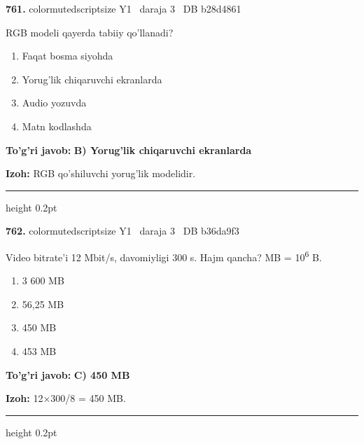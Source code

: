 \documentclass[10pt,a4paper,oneside]{article}
\begin{document}
\noindent\textbf{\color{ink}761.}  {color{muted}scriptsize Y1 \textbullet\ daraja 3 \textbullet\ DB b28d4861}
\par
RGB modeli qayerda tabiiy qo'llanadi?
\begin{enumerate}[label=\Alph*),leftmargin=9mm]
\item Faqat bosma siyohda
\item Yorug'lik chiqaruvchi ekranlarda
\item Audio yozuvda
\item Matn kodlashda
\end{enumerate}
\begin{tcolorbox}[enhanced,breakable,colback=teal!4,colframe=teal!50!black,boxrule=0.5pt,arc=1.1mm,left=3mm,right=3mm,top=1.7mm,bottom=1.7mm,before skip=2mm,after skip=2mm]
\textbf{\color{teal}To'g'ri javob:} \textbf{B) Yorug'lik chiqaruvchi ekranlarda}
\par\smallskip
\textbf{Izoh:} RGB qo'shiluvchi yorug'lik modelidir.
\end{tcolorbox}
\vspace{2mm}\hrule height 0.2pt \vspace{3mm}

\noindent\textbf{\color{ink}762.}  {color{muted}scriptsize Y1 \textbullet\ daraja 3 \textbullet\ DB b36da9f3}
\par
Video bitrate'i 12 Mbit/s, davomiyligi 300 s. Hajm qancha? MB = 10\textsuperscript{6} B.
\begin{enumerate}[label=\Alph*),leftmargin=9mm]
\item 3 600 MB
\item 56,25 MB
\item 450 MB
\item 453 MB
\end{enumerate}
\begin{tcolorbox}[enhanced,breakable,colback=teal!4,colframe=teal!50!black,boxrule=0.5pt,arc=1.1mm,left=3mm,right=3mm,top=1.7mm,bottom=1.7mm,before skip=2mm,after skip=2mm]
\textbf{\color{teal}To'g'ri javob:} \textbf{C) 450 MB}
\par\smallskip
\textbf{Izoh:} 12\ensuremath{\times}300/8 = 450 MB.
\end{tcolorbox}
\vspace{2mm}\hrule height 0.2pt \vspace{3mm}
\end{document}
